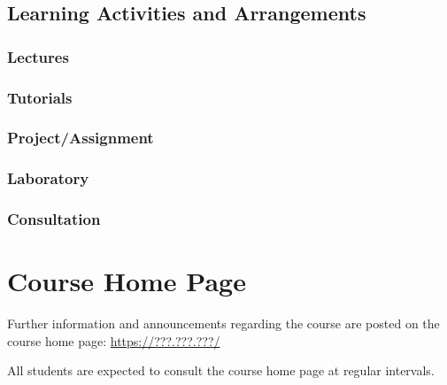 \documentclass[11pt]{eie-cbo}
\begin{document}
\subsection{Learning Activities and Arrangements}


\subsubsection{Lectures}

\subsubsection{Tutorials}

\subsubsection{Project/Assignment}

\subsubsection{Laboratory}

\subsubsection{Consultation}

\section{Course Home Page}\label{web}
Further information and announcements regarding the course are posted on the course home page: \url{https://???.???.???/}

All students are expected to consult the course home page at regular intervals.
\end{document}
